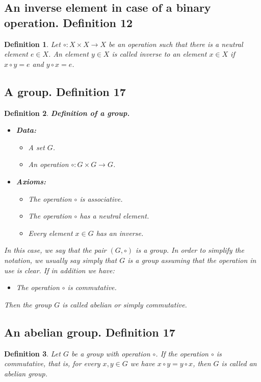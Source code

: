 \documentclass{article}
\newtheorem*{customdefinition}{Definition}
\begin{document}
\subsection*{An inverse element in case of a binary operation. Definition 12}
\begin{customdefinition}
Let \(\circ : X \times X \rightarrow X\) be an operation such that there is a neutral element \(e \in X\). An element \(y \in X\) is called inverse to an element \(x \in X\) if \(x \circ y = e\) and \(y \circ x = e\).
\end{customdefinition}

\subsection*{A group. Definition 17}
\begin{customdefinition}
\textbf{Definition of a group.}
\begin{itemize}
    \item \textbf{Data:}
        \begin{itemize}
            \item A set \(G\).
            \item An operation \(\circ : G \times G \rightarrow G\).
        \end{itemize}
    \item \textbf{Axioms:}
        \begin{itemize}
            \item The operation \(\circ\) is associative.
            \item The operation \(\circ\) has a neutral element.
            \item Every element \(x \in G\) has an inverse.
        \end{itemize}
\end{itemize}
In this case, we say that the pair \((G, \circ)\) is a group. In order to simplify the notation, we usually say simply that \(G\) is a group assuming that the operation in use is clear. If in addition we have:
\begin{itemize}
    \item The operation \(\circ\) is commutative.
\end{itemize}
Then the group \(G\) is called abelian or simply commutative.
\end{customdefinition}

\subsection*{An abelian group. Definition 17}
\begin{customdefinition}
Let \( G \) be a group with operation \( \circ \). If the operation \( \circ \) is commutative, that is, for every \( x, y \in G \) we have \( x \circ y = y \circ x \), then \( G \) is called an abelian group.
\end{customdefinition}
\end{document}
